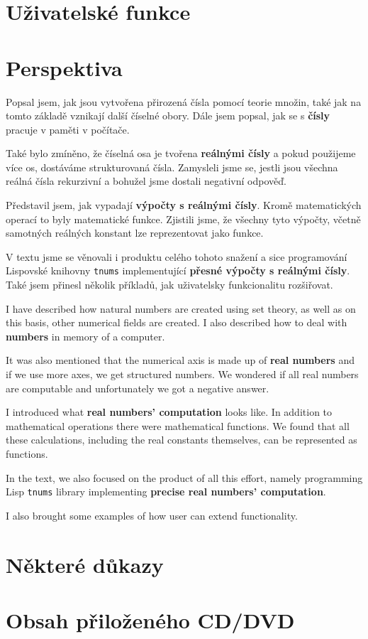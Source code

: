 \documentclass[
master=false,
field=inf,
encoding=utf8,
language=czech,
printversion=false,]{kidiplom}
\begin{document}
\section{Uživatelské funkce}

\clearpage
\section{Perspektiva}

\begin{kiconclusions}
Popsal jsem, jak jsou vytvořena přirozená čísla pomocí teorie množin, také jak na tomto základě vznikají další číselné obory. Dále jsem popsal, jak se s \textbf{čísly} pracuje v paměti v počítače.

Také bylo zmíněno, že číselná osa je tvořena \textbf{reálnými čísly} a pokud použijeme více os, dostáváme strukturovaná čísla. Zamysleli jsme se, jestli jsou všechna reálná čísla rekurzivní a bohužel jsme dostali negativní odpověď.

Představil jsem, jak vypadají \textbf{výpočty s reálnými čísly}. Kromě matematických operací to byly matematické funkce. Zjistili jsme, že všechny tyto výpočty, včetně samotných reálných konstant lze reprezentovat jako funkce.

V textu jsme se věnovali i produktu celého tohoto snažení a sice programování Lispovské knihovny \texttt{tnums} implementující \textbf{přesné výpočty s reálnými čísly}. Také jsem přinesl několik příkladů, jak uživatelsky funkcionalitu rozšiřovat.
\end{kiconclusions}
\begin{kiconclusions}[english]
I have described how natural numbers are created using set theory, as well as on this basis, other numerical fields are created. I also described how to deal with \textbf{numbers} in memory of a computer.

It was also mentioned that the numerical axis is made up of \textbf{real numbers} and if we use more axes, we get structured numbers. We wondered if all real numbers are computable and unfortunately we got a negative answer.

I introduced what \textbf{real numbers' computation} looks like. In addition to mathematical operations there were mathematical functions. We found that all these calculations, including the real constants themselves, can be represented as functions.

In the text, we also focused on the product of all this effort, namely programming Lisp \texttt{tnums} library implementing \textbf{precise real numbers' computation}.

I also brought some examples of how user can extend functionality.
\end{kiconclusions}
\clearpage
\printbibliography[heading=bibintoc, title={Seznam literatury}]
\appendix
\section{Některé důkazy}\label{pril:dukazy}

\clearpage
\section{Obsah přiloženého CD/DVD}\label{pril:adresar}

\end{document}
